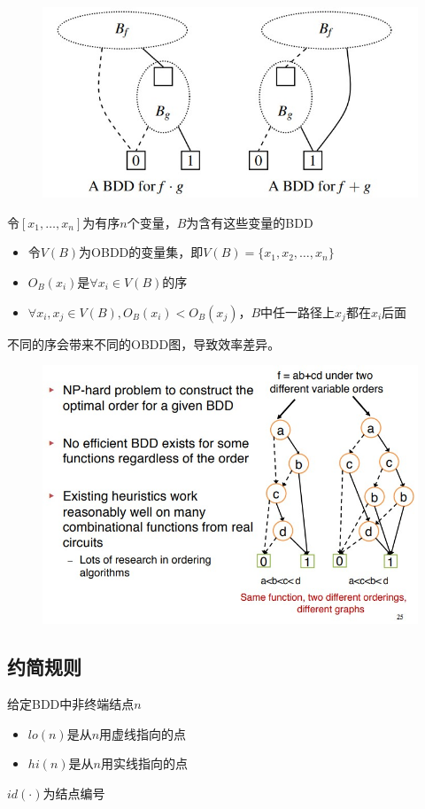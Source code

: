\begin{figure}[H]
\centering
\includegraphics[width=0.6\linewidth]{fig/shortcut_bdd.jpg}
\end{figure}

\begin{definition}[有序BDD]
令$[x_1,\ldots,x_n]$为有序$n$个变量，$B$为含有这些变量的BDD
\begin{itemize}
	\item 令$V(B)$为OBDD的变量集，即$V(B)=\{x_1,x_2,\ldots,x_n\}$
	\item $O_B(x_i)$是$\forall x_i\in V(B)$的序
	\item $\forall x_i,x_j\in V(B),O_B(x_i)<O_B(x_j)$，$B$中任一路径上$x_j$都在$x_i$后面
\end{itemize}
\end{definition}

不同的序会带来不同的OBDD图，导致效率差异。
\begin{figure}[H]
\centering
\includegraphics[width=0.8\linewidth]{fig/bdd_limitation.jpg}
\end{figure}

\subsection{约简规则}
\begin{definition}
给定BDD中非终端结点$n$
\begin{itemize}
	\item $lo(n)$是从$n$用虚线指向的点
	\item $hi(n)$是从$n$用实线指向的点
\end{itemize}
$id(\cdot)$为结点编号
\end{definition}

